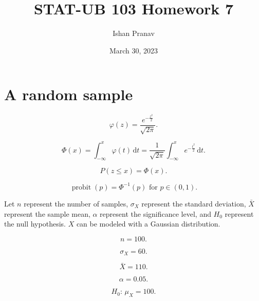 \documentclass[12pt]{article}
\title{STAT-UB 103 Homework 7}
\author{Ishan Pranav}
\date{March 30, 2023}
\DeclareMathOperator{\probit}{probit}
\begin{document}
\maketitle
\section{A random sample}
\[\varphi(z)=\frac{e^{-\frac{z^2}{2}}}{\sqrt{2\pi}}.\]

\[\Phi(x)=\int^x_{-\infty}{\varphi(t)\,\mathrm{d}t}=\frac{1}{\sqrt{2\pi}}\int^x_{-\infty}{e^{-\frac{t^2}{2}}\,\mathrm{d}t}.\]

\[P(z\leq x)=\Phi(x).\]

\[\probit(p)=\Phi^{-1}(p)\text{ for }p\in(0,1).\]

Let $n$ represent the number of samples, $\sigma_X$ represent the standard deviation, $\bar{X}$ represent the sample mean, $\alpha$ represent the significance level, and $H_0$ represent the null hypothesis. $X$ can be modeled with a Gaussian distribution.

\[n=100.\]

\[\sigma_X=60.\]

\[\bar{X}=110.\]

\[\alpha=0.05.\]

\[H_0:\,\mu_X=100.\]
\end{document}
